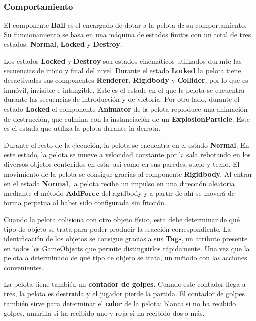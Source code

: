 \subsubsection{Comportamiento}
El componente \textbf{Ball} es el encargado de dotar a la pelota de su comportamiento. Su funcionamiento se basa en una máquina de estados finitos con un total de tres estados: \textbf{Normal}, \textbf{Locked} y \textbf{Destroy}.

Los estados \textbf{Locked} y \textbf{Destroy} son estados cinemáticos utilizados durante las secuencias de inicio y final del nivel. Durante el estado \textbf{Locked} la pelota tiene desactivados sus componentes \textbf{Renderer}, \textbf{Rigidbody} y \textbf{Collider}, por lo que es inmóvil, invisible e intangible. Este es el estado en el que la pelota se encuentra durante las secuencias de introducción y de victoria. Por otro lado, durante el estado \textbf{Locked} el componente \textbf{Animator} de la pelota reproduce una animación de destrucción, que culmina con la instanciación de un \textbf{ExplosionParticle}. Este es el estado que utiliza la pelota durante la derrota.

Durante el resto de la ejecución, la pelota se encuentra en el estado \textbf{Normal}. En este estado, la pelota se mueve a velocidad constante por la sala rebotando en los diversos objetos contenidos en esta, así como en sus paredes, suelo y techo. El movimiento de la pelota se consigue gracias al componente \textbf{Rigidbody}. Al entrar en el estado \textbf{Normal}, la pelota recibe un impulso en una dirección aleatoria mediante el método \textbf{AddForce} del rigidbody y a partir de ahí se moverá de forma perpetua al haber sido configurada sin fricción.

Cuando la pelota colisiona con otro objeto físico, esta debe determinar de qué tipo de objeto se trata para poder producir la reacción correspondiente. La identificación de los objetos se consigue gracias a sus \textbf{Tags}, un atributo presente en todos los GameObjects que permite distinguirlos rápidamente. Una vez que la pelota a determinado de qué tipo de objeto se trata, un método con las acciones convenientes.

La pelota tiene también un \textbf{contador de golpes}. Cuando este contador llega a tres, la pelota es destruida y el jugador pierde la partida. El contador de golpes también sirve para determinar el \textbf{color} de la pelota: blanca si no ha recibido golpes, amarilla si ha recibido uno y roja si ha recibido dos o más. 

